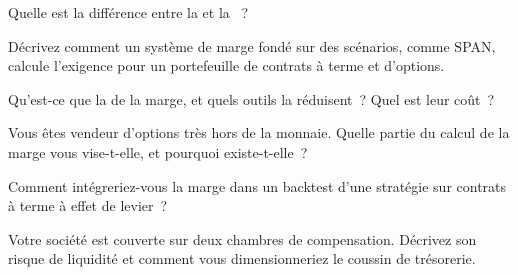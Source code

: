 \begin{interviewq}\label{iq:m1:margin:1}
Quelle est la différence entre la  et la ~?
\end{interviewq}

\begin{interviewq}\label{iq:m1:margin:2}
Décrivez comment un système de marge fondé sur des scénarios, comme SPAN, calcule
l'exigence pour un portefeuille de contrats à terme et d'options.
\end{interviewq}

\begin{interviewq}\label{iq:m1:margin:3}
Qu'est-ce que la  de la marge, et quels outils la réduisent~? Quel est leur
coût~?
\end{interviewq}

\begin{interviewq}\label{iq:m1:margin:4}
Vous êtes vendeur d'options très hors de la monnaie. Quelle partie du calcul de la marge
vous vise-t-elle, et pourquoi existe-t-elle~?
\end{interviewq}

\begin{interviewq}\label{iq:m1:margin:5}
Comment intégreriez-vous la marge dans un backtest d'une stratégie sur contrats à terme à effet de levier~?
\end{interviewq}

\begin{interviewq}\label{iq:m1:margin:6}
Votre société est couverte sur deux chambres de compensation. Décrivez son risque de liquidité
et comment vous dimensionneriez le coussin de trésorerie.
\end{interviewq}
